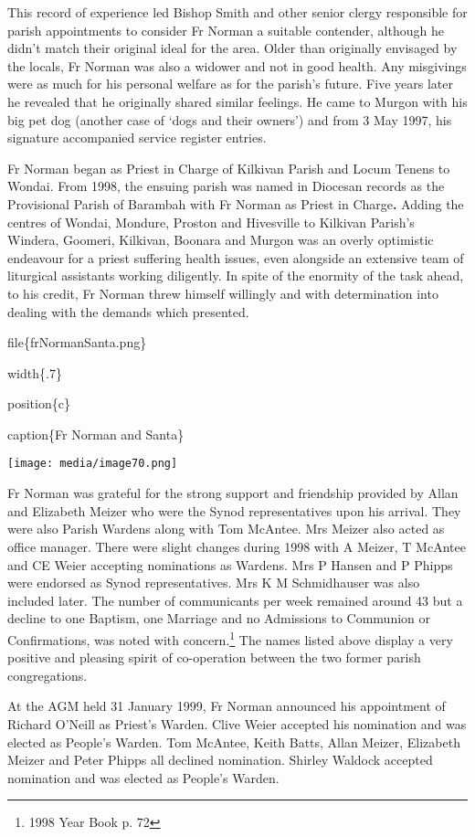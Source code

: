 This record of experience led Bishop Smith and other senior clergy responsible for parish appointments to consider Fr Norman a suitable contender, although he didn't match their original ideal for the area. Older than originally envisaged by the locals, Fr Norman was also a widower and not in good health. Any misgivings were as much for his personal welfare as for the parish's future. Five years later he revealed that he originally shared similar feelings. He came to Murgon with his big pet dog (another case of `dogs and their owners') and from 3 May 1997, his signature accompanied service register entries.

Fr Norman began as Priest in Charge of Kilkivan Parish and Locum Tenens to Wondai. From 1998, the ensuing parish was named in Diocesan records as the Provisional Parish of Barambah with Fr Norman as Priest in Charge\textbf{.} Adding the centres of Wondai, Mondure, Proston and Hivesville to Kilkivan Parish's Windera, Goomeri, Kilkivan, Boonara and Murgon was an overly optimistic endeavour for a priest suffering health issues, even alongside an extensive team of liturgical assistants working diligently. In spite of the enormity of the task ahead, to his credit, Fr Norman threw himself willingly and with determination into dealing with the demands which presented.

file\{frNormanSanta.png\}

width\{.7\}

position\{c\}

caption\{Fr Norman and Santa\}

\texttt{[image: media/image70.png]}

Fr Norman was grateful for the strong support and friendship provided by Allan and Elizabeth Meizer who were the Synod representatives upon his arrival. They were also Parish Wardens along with Tom McAntee. Mrs Meizer also acted as office manager. There were slight changes during 1998 with A Meizer, T McAntee and CE Weier accepting nominations as Wardens. Mrs P Hansen and P Phipps were endorsed as Synod representatives. Mrs K M Schmidhauser was also included later. The number of communicants per week remained around 43 but a decline to one Baptism, one Marriage and no Admissions to Communion or Confirmations, was noted with concern.\footnote{1998 Year Book p. 72} The names listed above display a very positive and pleasing spirit of co-operation between the two former parish congregations.

At the AGM held 31 January 1999, Fr Norman announced his appointment of Richard O'Neill as Priest's Warden. Clive Weier accepted his nomination and was elected as People's Warden. Tom McAntee, Keith Batts, Allan Meizer, Elizabeth Meizer and Peter Phipps all declined nomination. Shirley Waldock accepted nomination and was elected as People's Warden.


